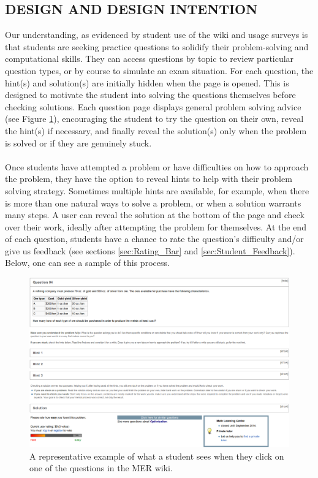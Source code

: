 \documentclass{primus}
\begin{document}
\subsection{DESIGN AND DESIGN INTENTION}\label{sec:Design_and_Design_Intention}
Our understanding, as evidenced by student use of the wiki and usage surveys is that students are seeking practice questions to solidify their problem-solving and computational skills.  They can access questions by topic to review particular question types, or by course to simulate an exam situation. For each question, the hint(s) and solution(s) are initially hidden when the page is opened.  This is designed to motivate the student into solving the questions themselves before checking solutions.  Each question page displays general problem solving advice (see Figure \ref{fig:question_page}), encouraging the student to try the question on their own, reveal the hint(s) if necessary, and finally reveal the solution(s) only when the problem is solved or if they are genuinely stuck.
\\\\
\noindent{}Once students have attempted a problem or have difficulties on how to approach the problem, they have the option to reveal hints to help with their problem solving strategy. Sometimes multiple hints are available, for example, when there is more than one natural ways to solve a problem, or when a solution warrants many steps. A user can reveal the solution at the bottom of the page and check over their work, ideally after attempting the problem for themselves.  
At the end of each question, students have a chance to rate the question’s difficulty and/or give us feedback (see sections \ref{sec:Rating_Bar} and \ref{sec:Student_Feedback}).  Below, one can see a sample of this process.
\begin{figure}[H]
\centering
\includegraphics[width=\textwidth]{figs/Question_Page.png}
\caption{A representative example of what a student sees when they click on one of the questions in the MER wiki.}\label{fig:question_page}
\end{figure}
\end{document}
